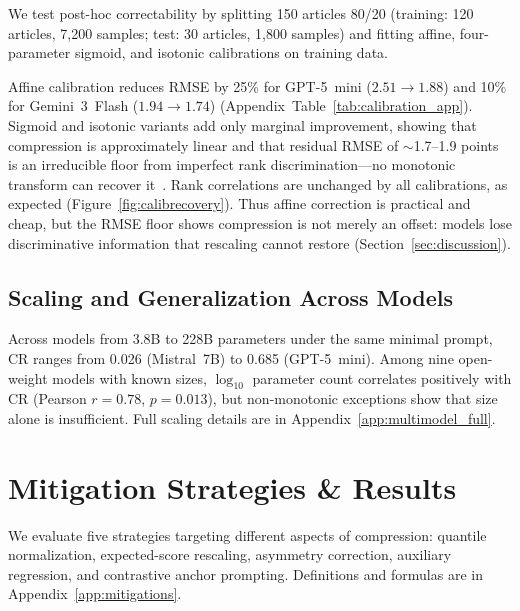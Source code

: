 \documentclass[11pt]{article}
\begin{document}
We test post-hoc correctability by splitting 150 articles 80/20
(training: 120 articles, 7{,}200 samples; test: 30 articles, 1{,}800
samples) and fitting affine, four-parameter sigmoid, and isotonic
calibrations on training data.

Affine calibration reduces RMSE by 25\% for GPT-5~mini ($2.51 \to
1.88$) and 10\% for Gemini~3~Flash ($1.94 \to 1.74$)
(Appendix~Table~\ref{tab:calibration_app}). Sigmoid and isotonic variants
add only marginal improvement, showing that compression is approximately
linear and that residual RMSE of $\sim$1.7--1.9 points is an irreducible
floor from imperfect rank discrimination---no monotonic transform can
recover it~\citep{liu2023geval}. Rank correlations are unchanged by all
calibrations, as expected (Figure~\ref{fig:calibrecovery}). Thus affine
correction is practical and cheap, but the RMSE floor shows compression
is not merely an offset: models lose discriminative information that
rescaling cannot restore (Section~\ref{sec:discussion}).


\subsection{Scaling and Generalization Across Models}
\label{sec:multimodel}

Across models from 3.8B to 228B parameters under the same minimal prompt,
CR ranges from 0.026 (Mistral~7B) to 0.685 (GPT-5~mini). Among nine
open-weight models with known sizes, $\log_{10}$ parameter count correlates
positively with CR (Pearson $r=0.78$, $p=0.013$), but non-monotonic
exceptions show that size alone is insufficient. Full scaling details are in
Appendix~\ref{app:multimodel_full}.

\section{Mitigation Strategies \& Results}
\label{sec:mitigation}
\label{sec:mitresults}

We evaluate five strategies targeting different aspects of compression:
quantile normalization, expected-score rescaling, asymmetry correction,
auxiliary regression, and contrastive anchor prompting. Definitions and formulas
are in Appendix~\ref{app:mitigations}.
\end{document}
